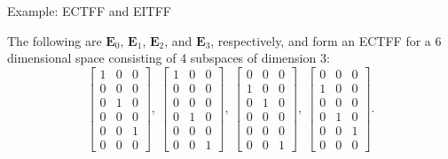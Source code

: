 \documentclass[12pt]{beamer}
\newcommand{\bfE}{\mathbf{E}}
\begin{document}
\begin{frame}{Example: ECTFF and EITFF}
\footnotesize{

The following are $\bfE_0$, $\bfE_1$, $\bfE_2$, and $\bfE_3$, respectively, and form an ECTFF for a 6 dimensional space consisting of 4 subspaces of dimension 3:
\begin{equation*}
    \left[\begin{array}{rrr}
    1 & 0 & 0\\
    0 & 0 & 0\\
    0 & 1 & 0\\
    0 & 0 & 0\\
    0 & 0 & 1\\
    0 & 0 & 0
    \end{array}\right],\
    \left[\begin{array}{rrr}
    1 & 0 & 0\\
    0 & 0 & 0\\
    0 & 0 & 0\\
    0 & 1 & 0\\
    0 & 0 & 0\\
    0 & 0 & 1
    \end{array}\right],\
    \left[\begin{array}{rrr}
    0 & 0 & 0\\
    1 & 0 & 0\\
    0 & 1 & 0\\
    0 & 0 & 0\\
    0 & 0 & 0\\
    0 & 0 & 1
    \end{array}\right],\
    \left[\begin{array}{rrr}
    0 & 0 & 0\\
    1 & 0 & 0\\
    0 & 0 & 0\\
    0 & 1 & 0\\
    0 & 0 & 1\\
    0 & 0 & 0
    \end{array}\right].
\end{equation*}

\vfill

}
\end{frame}
\end{document}
